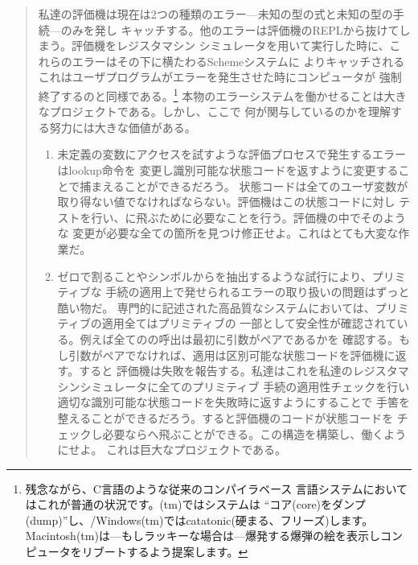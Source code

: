 \begin{quote}
私達の評価機は現在は2つの種類のエラー---未知の型の式と未知の型の手続---のみを発し
キャッチする。他のエラーは評価機のREPLから抜けてしまう。評価機をレジスタマシン
シミュレータを用いて実行した時に、これらのエラーはその下に横たわるSchemeシステムに
よりキャッチされるこれはユーザプログラムがエラーを発生させた時にコンピュータが
強制終了するのと同様である。\footnote{残念ながら、C言語のような従来のコンパイラベース
言語システムにおいてはこれが普通の状況です。(tm)ではシステムは
``コア(core)をダンプ(dump)''し、/Windows(tm)ではcatatonic(硬まる、フリーズ)します。
Macintosh(tm)は---もしラッキーな場合は---爆発する爆弾の絵を表示しコンピュータをリブートするよう提案します。}
本物のエラーシステムを働かせることは大きなプロジェクトである。しかし、ここで
何が関与しているのかを理解する努力には大きな価値がある。

\begin{enumerate}[a]

\item
未定義の変数にアクセスを試すような評価プロセスで発生するエラーはlookup命令を
変更し識別可能な状態コードを返すように変更することで捕まえることができるだろう。
状態コードは全てのユーザ変数が取り得ない値でなければならない。評価機はこの状態コードに対し
テストを行い、に飛ぶために必要なことを行う。評価機の中でそのような
変更が必要な全ての箇所を見つけ修正せよ。これはとても大変な作業だ。

\item
ゼロで割ることやシンボルからを抽出するような試行により、プリミティブな
手続の適用上で発せられるエラーの取り扱いの問題はずっと酷い物だ。
専門的に記述された高品質なシステムにおいては、プリミティブの適用全てはプリミティブの
一部として安全性が確認されている。例えば全てのの呼出は最初に引数がペアであるかを
確認する。もし引数がペアでなければ、適用は区別可能な状態コードを評価機に返す。すると
評価機は失敗を報告する。私達はこれを私達のレジスタマシンシミュレータに全てのプリミティブ
手続の適用性チェックを行い適切な識別可能な状態コードを失敗時に返すようにすることで
手筈を整えることができるだろう。すると評価機のコードが状態コードを
チェックし必要ならへ飛ぶことができる。この構造を構築し、働くようにせよ。
これは巨大なプロジェクトである。

\end{enumerate}
\end{quote}

